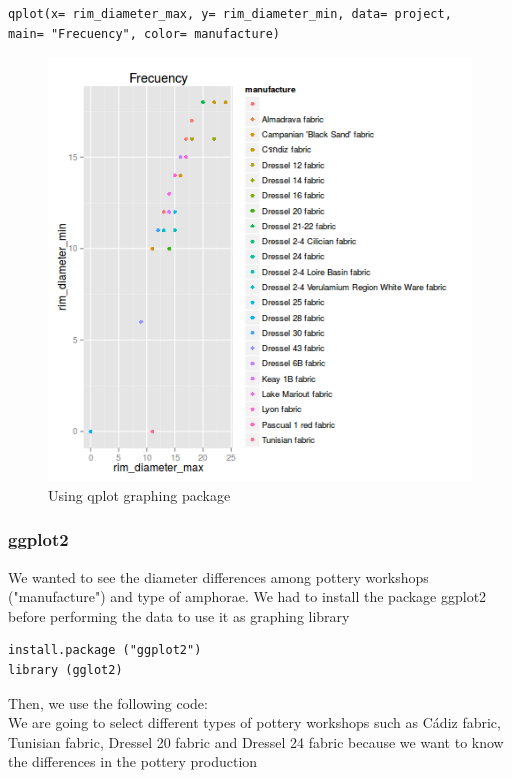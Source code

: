 \documentclass[10pt,a4paper]{article}
\begin{document}
\begin{verbatim}
qplot(x= rim_diameter_max, y= rim_diameter_min, data= project, 
main= "Frecuency", color= manufacture) 
\end{verbatim}

\begin{figure}[htp]
\centering
\includegraphics[scale=0.40]{qplotminmax.png}
\caption{Using qplot graphing package}
\label{qplot}
\end{figure}


\subsubsection{ggplot2}

We wanted to see the diameter differences among pottery workshops ("manufacture") and type of amphorae. We had to install the package ggplot2 before performing the data to use it as graphing library 

\begin{verbatim}
install.package ("ggplot2")
library (gglot2)
\end{verbatim}

Then, we use the following code: \\

We are going to select different types of pottery workshops such as C\'adiz fabric, Tunisian fabric, Dressel 20 fabric and Dressel 24 fabric because we want to know the differences in the pottery production
\end{document}
